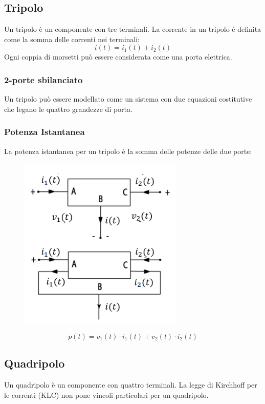 \subsection*{Tripolo}
Un tripolo è un componente con tre terminali. La corrente in un tripolo è definita come la somma delle correnti nei terminali:
\[
i(t) = i_1(t) + i_2(t)
\]
Ogni coppia di morsetti può essere considerata come una porta elettrica.

\subsubsection*{2-porte sbilanciato}
Un tripolo può essere modellato come un sistema con due equazioni costitutive che legano le quattro grandezze di porta.

\subsubsection*{Potenza Istantanea}
La potenza istantanea per un tripolo è la somma delle potenze delle due porte:

\begin{figure}[H]
    \centering
    \includegraphics[width=0.7\textwidth]{capitoli/capitolo2/immagini/image7.png}
\end{figure}

\[
p(t) = v_1(t) \cdot i_1(t) + v_2(t) \cdot i_2(t)
\]

\subsection*{Quadripolo}
Un quadripolo è un componente con quattro terminali. La legge di Kirchhoff per le correnti (KLC) non pone vincoli particolari per un quadripolo.

